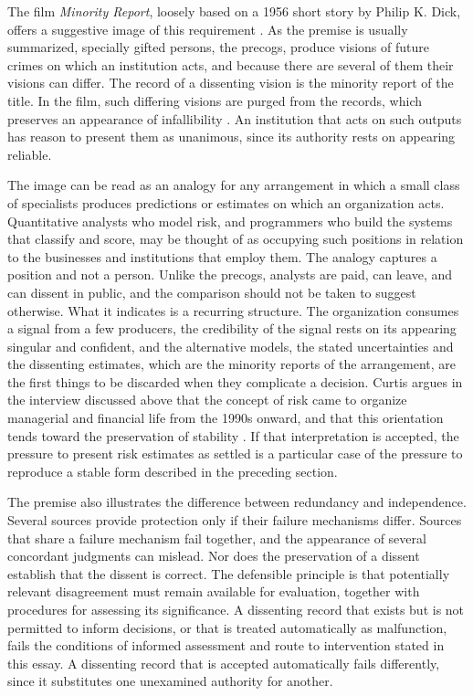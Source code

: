 \documentclass[11pt]{article}
\theoremstyle{definition}
\theoremstyle{remark}
\begin{document}
The film \emph{Minority Report}, loosely based on a 1956 short story by Philip K. Dick, offers a suggestive image of this requirement \cite{dick1956,spielberg2002}. As the premise is usually summarized, specially gifted persons, the precogs, produce visions of future crimes on which an institution acts, and because there are several of them their visions can differ. The record of a dissenting vision is the minority report of the title. In the film, such differing visions are purged from the records, which preserves an appearance of infallibility \cite{spielberg2002}. An institution that acts on such outputs has reason to present them as unanimous, since its authority rests on appearing reliable.

The image can be read as an analogy for any arrangement in which a small class of specialists produces predictions or estimates on which an organization acts. Quantitative analysts who model risk, and programmers who build the systems that classify and score, may be thought of as occupying such positions in relation to the businesses and institutions that employ them. The analogy captures a position and not a person. Unlike the precogs, analysts are paid, can leave, and can dissent in public, and the comparison should not be taken to suggest otherwise. What it indicates is a recurring structure. The organization consumes a signal from a few producers, the credibility of the signal rests on its appearing singular and confident, and the alternative models, the stated uncertainties and the dissenting estimates, which are the minority reports of the arrangement, are the first things to be discarded when they complicate a decision. Curtis argues in the interview discussed above that the concept of risk came to organize managerial and financial life from the 1990s onward, and that this orientation tends toward the preservation of stability \cite{brandcurtis2016}. If that interpretation is accepted, the pressure to present risk estimates as settled is a particular case of the pressure to reproduce a stable form described in the preceding section.

The premise also illustrates the difference between redundancy and independence. Several sources provide protection only if their failure mechanisms differ. Sources that share a failure mechanism fail together, and the appearance of several concordant judgments can mislead. Nor does the preservation of a dissent establish that the dissent is correct. The defensible principle is that potentially relevant disagreement must remain available for evaluation, together with procedures for assessing its significance. A dissenting record that exists but is not permitted to inform decisions, or that is treated automatically as malfunction, fails the conditions of informed assessment and route to intervention stated in this essay. A dissenting record that is accepted automatically fails differently, since it substitutes one unexamined authority for another.
\end{document}
